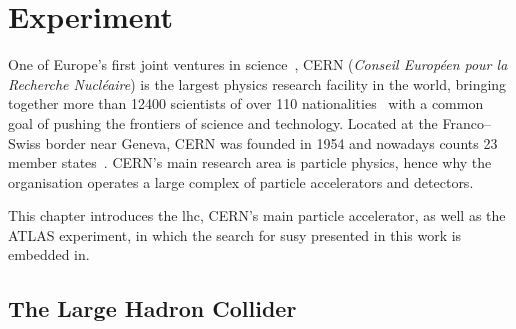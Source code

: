 
\chapter{Experiment} 

\ifpdf
    \graphicspath{{chapter-experiment/Figs/Raster/}{chapter-experiment/Figs/PDF/}{chapter-experiment/Figs/}}
\else
    \graphicspath{{chapter-experiment/Figs/Vector/}{chapter-experiment/Figs/}}
\fi


One of Europe's first joint ventures in science~\cite{About:1997225}, CERN (\textit{Conseil Européen pour la Recherche Nucléaire}) is the largest physics research facility in the world, bringing together more than \num[group-separator={,}]{12400} scientists of over 110 nationalities~\cite{CERN:2723123} with a common goal of pushing the frontiers of science and technology. Located at the Franco--Swiss border near Geneva, CERN was founded in 1954 and nowadays counts 23 member states~\cite{CERN:2723123}. CERN's main research area is particle physics, hence why the organisation operates a large complex of particle accelerators and detectors.

This chapter introduces the \gls{lhc}, CERN's main particle accelerator, as well as the ATLAS experiment, in which the search for \gls{susy} presented in this work is embedded in.

\section{The Large Hadron Collider}\label{sec:lhc}

